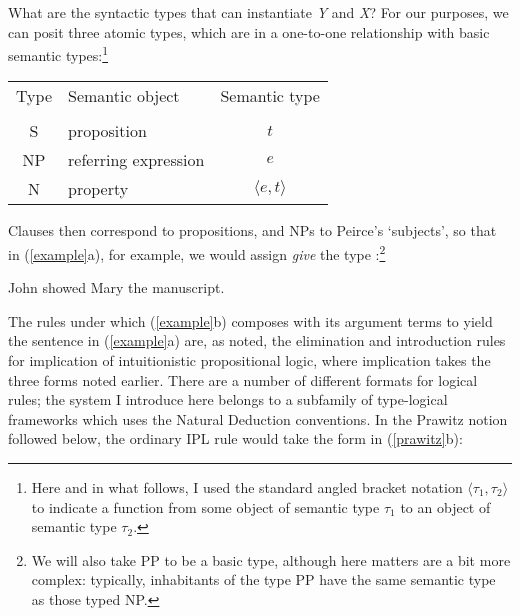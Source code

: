 \documentclass[output=paper,colorlinks,citecolor=brown]{langscibook}
\begin{document}
What are the syntactic types that can instantiate \textit{Y} and \textit{X}? For our
purposes, we can posit three atomic types, which are in a
one-to-one relationship with basic semantic types:\footnote{Here and
in what follows, I used the standard angled bracket notation
$\langle\tau_1,\tau_2\rangle$ to indicate a function from some object
of semantic type $\tau_1$ to an object of semantic type $\tau_2$.}

\begin{exe}
 \ex\label{types}
\begin{tabular}{clc}
\textsf{Type} & \textsf{Semantic object} & \textsf{Semantic type} \\
 & & \\
S & proposition & $t$\\
NP & referring expression & $e$ \\
N  & property & $\langle e,t\rangle$ \\
\end{tabular}
\end{exe}
Clauses then correspond to propositions, and NPs to Peirce's
`subjects', so that in (\ref{example}a), for example, we would assign \textit{give}
the type :\footnote{We will also take PP to be a basic type,
although here matters are a bit more complex: typically, inhabitants of
the type PP have the same semantic type as those typed NP.}


\begin{exe}
 \ex\label{example}
  \begin{xlist}
 \ex\label{}
    John showed Mary the manuscript.
 \ex\label{}
  \end{xlist}
\end{exe}
The rules under which (\ref{example}b) composes with its argument terms to
yield the sentence in (\ref{example}a) are, as noted, the elimination and
introduction rules for implication of intuitionistic propositional
logic, where implication takes the three forms noted earlier. There
are a number of different formats for logical rules; the system I
introduce here belongs to a subfamily of type-logical frameworks which
uses the Natural Deduction conventions. In the Prawitz notion followed
below, the ordinary IPL rule would take the form in (\ref{prawitz}b):
\end{document}
